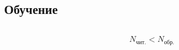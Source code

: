 \subsection{Обучение}

\begin{frame}[t] %
	\begin{columns}
		\begin{column}{2.7cm}
		\end{column}
		\begin{column}{2cm}
			\begin{scriptsize}
				\[
					N_{\text{чит.}} < N_{\text{обр.}}
				\]
			\end{scriptsize}
		\end{column}
		\begin{column}{5.2cm}
		\end{column}
	\end{columns}
\end{frame}
